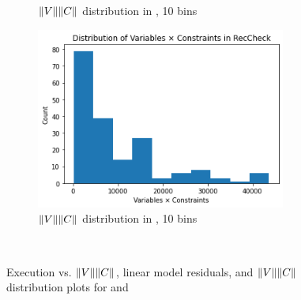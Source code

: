 \begin{figure}
\begin{subfigure}{0.475\textwidth}
\caption{$\lVert V\rVert\lVert C\rVert$ distribution in \solve, 10 bins}
\label{fig:stats:distr-solve}
\end{subfigure}
\hfill
\begin{subfigure}{0.475\textwidth}
\includegraphics[width=0.9\textwidth]{images/distribution-RecCheck.png}
\caption{$\lVert V\rVert\lVert C\rVert$ distribution in \RecCheck, 10 bins}
\label{fig:stats:distr-reccheck}
\end{subfigure}
\\[2ex]
\caption{Execution vs. $\lVert V\rVert\lVert C\rVert$, linear model residuals, and $\lVert V\rVert\lVert C\rVert$ distribution plots for \solve and \RecCheck}
\label{fig:stats}
\end{figure}
